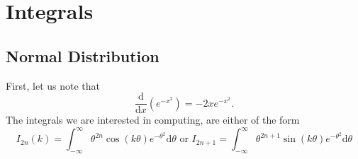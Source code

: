 \documentclass[]{report}
\begin{document}
\appendix

\chapter{Integrals}
\section{Normal Distribution}
First, let us note that
\[
\frac{\text{d}}{\text{d}x}(e^{- x^2}) = - 2 x e^{ - x ^2}
.\]
The integrals we are interested in computing, are either of the form
\[
	I_{2n}(k) = \int_{- \infty}^{\infty} \theta^{2n} \cos (k \theta) e^{ - \theta^2}\text{d}\theta \text{ or } I_{2n + 1} = \int_{- \infty}^{\infty} \theta^{2n + 1} \sin (k \theta) e^{ - \theta^2}\text{d} \theta
\]



\end{document}
